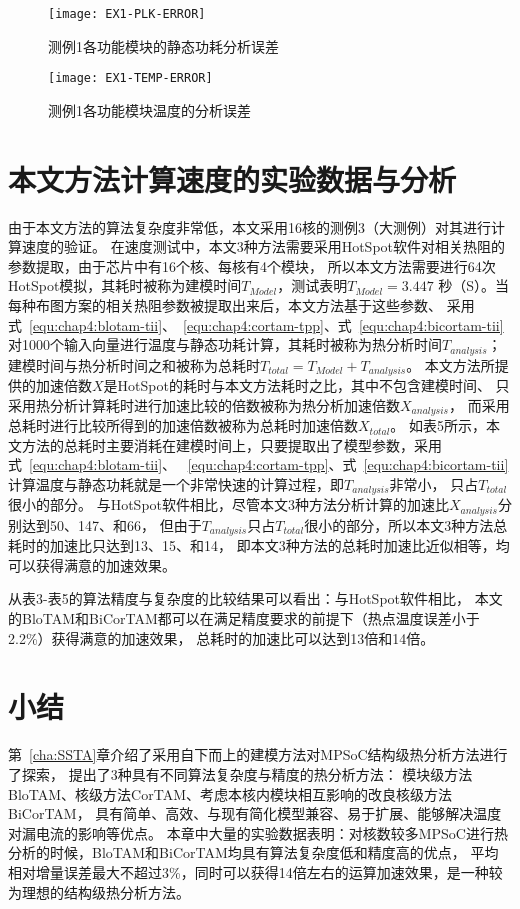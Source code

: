 \begin{figure}[H]
  \centering
  \texttt{[image: EX1-PLK-ERROR]}
  \caption{测例1各功能模块的静态功耗分析误差}
  \label{fig:ex1-plk-error}
\end{figure}
\begin{figure}[H]
  \centering
  \texttt{[image: EX1-TEMP-ERROR]}
  \caption{测例1各功能模块温度的分析误差}
  \label{fig:ex1-temp-error}
\end{figure}


\section{本文方法计算速度的实验数据与分析}
\label{exp-speedup}
由于本文方法的算法复杂度非常低，本文采用16核的测例3（大测例）对其进行计算速度的验证。 在速度测试中，本文3种方法需要采用HotSpot软件对相关热阻的参数提取，由于芯片中有16个核、每核有4个模块， 所以本文方法需要进行64次HotSpot模拟，其耗时被称为建模时间$T_{Model}$，测试表明$T_{Model} = 3.447$ 秒（S）。当每种布图方案的相关热阻参数被提取出来后，本文方法基于这些参数、 采用式~\ref{equ:chap4:blotam-tii}、~\ref{equ:chap4:cortam-tpp}、式~\ref{equ:chap4:bicortam-tii} 对1000个输入向量进行温度与静态功耗计算，其耗时被称为热分析时间$T_{analysis}$； 建模时间与热分析时间之和被称为总耗时$T_{total}=T_{Model}+T_{analysis}$。 本文方法所提供的加速倍数$X$是HotSpot的耗时与本文方法耗时之比，其中不包含建模时间、 只采用热分析计算耗时进行加速比较的倍数被称为热分析加速倍数$X_{analysis}$， 而采用总耗时进行比较所得到的加速倍数被称为总耗时加速倍数$X_{total}$。
如表5所示，本文方法的总耗时主要消耗在建模时间上，只要提取出了模型参数，采用式~\ref{equ:chap4:blotam-tii}、 ~\ref{equ:chap4:cortam-tpp}、式~\ref{equ:chap4:bicortam-tii} 计算温度与静态功耗就是一个非常快速的计算过程，即$T_{analysis}$非常小， 只占$T_{total}$很小的部分。 与HotSpot软件相比，尽管本文3种方法分析计算的加速比$X_{analysis}$分别达到50、147、和66， 但由于$T_{analysis}$只占$T_{total}$很小的部分，所以本文3种方法总耗时的加速比只达到13、15、和14， 即本文3种方法的总耗时加速比近似相等，均可以获得满意的加速效果。

从表3-表5的算法精度与复杂度的比较结果可以看出：与HotSpot软件相比， 本文的BloTAM和BiCorTAM都可以在满足精度要求的前提下（热点温度误差小于2.2\%）获得满意的加速效果， 总耗时的加速比可以达到13倍和14倍。

\section{小结}
第~\ref{cha:SSTA}章介绍了采用自下而上的建模方法对MPSoC结构级热分析方法进行了探索， 提出了3种具有不同算法复杂度与精度的热分析方法： 模块级方法BloTAM、核级方法CorTAM、考虑本核内模块相互影响的改良核级方法BiCorTAM， 具有简单、高效、与现有简化模型兼容、易于扩展、能够解决温度对漏电流的影响等优点。 本章中大量的实验数据表明：对核数较多MPSoC进行热分析的时候，BloTAM和BiCorTAM均具有算法复杂度低和精度高的优点， 平均相对增量误差最大不超过3\%，同时可以获得14倍左右的运算加速效果，是一种较为理想的结构级热分析方法。











